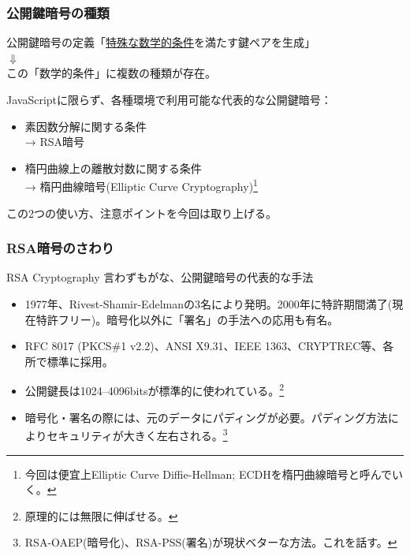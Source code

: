 \documentclass[12pt,dvipdfmx]{beamer}
\begin{document}
\begin{frame}
\frametitle{公開鍵暗号の種類}
\begin{exampleblock}{}
\begin{center}
公開鍵暗号の定義「\underline{特殊な数学的条件}を満たす鍵ペアを生成」\\[0.5ex]
 $\Downarrow$\\[0.5ex]
この「数学的条件」に複数の種類が存在。
\end{center}
\end{exampleblock}

\vspace{2ex}

JavaScriptに限らず、各種環境で利用可能な代表的な公開鍵暗号：
\begin{itemize}
 \item 素因数分解に関する条件\\ → \alert{RSA暗号}
 \item 楕円曲線上の離散対数に関する条件\\ → \alert{楕円曲線暗号(Elliptic Curve Cryptography)}\footnote[frame]{\scriptsize 今回は便宜上Elliptic Curve Diffie-Hellman; ECDHを楕円曲線暗号と呼んでいく。}
\end{itemize}
この2つの使い方、注意ポイントを今回は取り上げる。
\end{frame}

\begin{frame}
\frametitle{RSA暗号のさわり}
\begin{block}{RSA Cryptography}
言わずもがな、公開鍵暗号の代表的な手法
\begin{itemize}
 \item 1977年、Rivest-Shamir-Edelmanの3名により発明。2000年に特許期間満了(現在特許フリー)。暗号化以外に「署名」の手法への応用も有名。
 \item RFC 8017 (PKCS\#1 v2.2)、ANSI X9.31、IEEE 1363、CRYPTREC等、各所で標準に採用。
 \item 公開鍵長は1024--4096bitsが標準的に使われている。\footnote[frame]{原理的には無限に伸ばせる。}
 \item 暗号化・署名の際には、元のデータにパディングが必要。\alert{パディング方法によりセキュリティが大きく左右される。}\footnote[frame]{RSA-OAEP(暗号化)、RSA-PSS(署名)が現状ベターな方法。これを話す。}
\end{itemize}
\end{block}

\end{frame}
\end{document}
